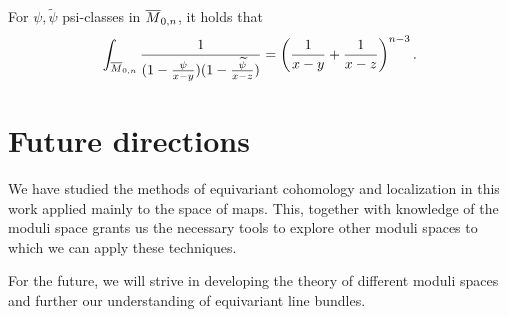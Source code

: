 \documentclass[12pt]{memoir}
\begin{document}
\begin{Lem}
    For $\psi,\widetilde\psi$ psi-classes in $\overline M_{0,n}$, it holds that
    $$\int_{\overline M_{0,n}}\frac{1}{(1-\frac{\psi}{x-y})(1-\frac{\widetilde\psi}{x-z})}=\left(\frac{1}{x-y}+\frac{1}{x-z}\right)^{n-3}.$$
\end{Lem}
\section{Future directions}

We have studied the methods of equivariant cohomology and localization in this work applied mainly to the space of maps. This, together with knowledge of the moduli space grants us the necessary tools to explore other moduli spaces to which we can apply these techniques.\par
For the future, we will strive in developing the theory of different moduli spaces and further our understanding of equivariant line bundles.
\ifx\nextra\undefined
\printindex
\else\fi
\nocite{*}


\end{document}
